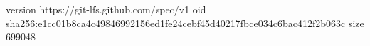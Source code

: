 version https://git-lfs.github.com/spec/v1
oid sha256:e1cc01b8ca4c49846992156ed1fe24cebf45d40217fbce034c6bac412f2b063c
size 699048

